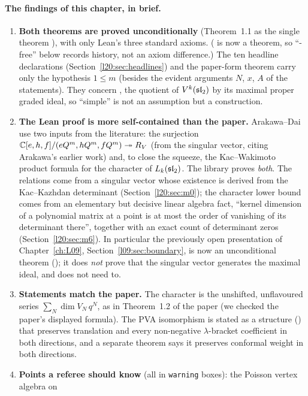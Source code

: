 \paragraph{The findings of this chapter, in brief.}
\begin{enumerate}
\item \textbf{Both theorems are proved unconditionally} (Theorem~1.1 as the single theorem
  ), with only Lean's
  three standard axioms. ( is now a theorem, so ``-free'' below records history, not an axiom
  difference.) The ten headline
  declarations (Section~\ref{l20:sec:headlines}) and the paper-form theorem carry only the hypothesis $1\le m$ (besides the
  evident arguments $N$, $x$, $A$ of the statements). They concern
  , the quotient of $V^k(\mathfrak{sl}_2)$ by its maximal proper
  graded ideal, so ``simple'' is not an assumption but a construction.
\item \textbf{The Lean proof is more self-contained than the paper.} Arakawa--Dai use two inputs from
  the literature: the surjection ${\mathbb{C}}[e,h,f]/(eQ^m,hQ^m,fQ^m)\twoheadrightarrow R_V$
  (from the singular vector, citing Arakawa's earlier work) and, to close the squeeze, the
  Kac--Wakimoto product formula for the character of $L_k(\mathfrak{sl}_2)$. The library proves \emph{both}.
  The relations come from a singular vector whose existence is derived from the Kac--Kazhdan determinant
  (Section~\ref{l20:sec:m0}); the character lower bound comes from an elementary but decisive linear
  algebra fact, ``kernel dimension of a polynomial matrix at a point is at most the order of vanishing of
  its determinant there'', together with an exact count of determinant zeros (Section~\ref{l20:sec:m6}).
  In particular the previously open presentation of Chapter~\ref{ch:L09}, Section~\ref{l09:sec:boundary},
  is now an unconditional theorem (); it does \emph{not} prove that the singular
  vector generates the maximal ideal, and does not need to.
\item \textbf{Statements match the paper.} The character is the unshifted, unflavoured series
  $\sum_N\dim V_N\,q^N$, as in Theorem~1.2 of the paper (we checked the paper's displayed formula). The
  PVA isomorphism is stated as a structure () that preserves translation
  and every non-negative $\lambda$-bracket coefficient in both directions, and a separate theorem says it
  preserves conformal weight in both directions.
\item \textbf{Points a referee should know} (all in \texttt{warning} boxes): the Poisson vertex algebra on

\end{enumerate}
